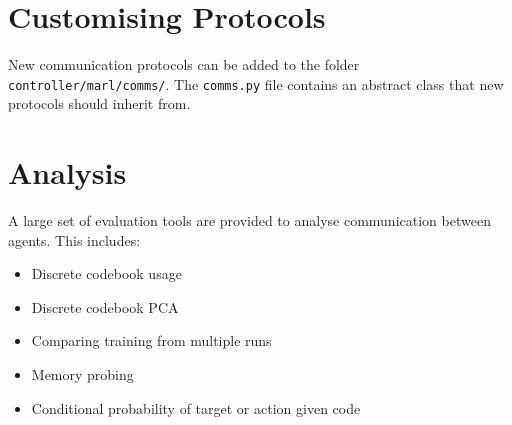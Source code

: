 \section{Customising Protocols}

New communication protocols can be added to the folder \texttt{controller/marl/comms/}. The \texttt{comms.py} file contains an abstract class that new protocols should inherit from.

\section{Analysis}

A large set of evaluation tools are provided to analyse communication between agents. This includes:

\begin{itemize}[noitemsep, topsep=0pt]
    \item Discrete codebook usage
    \item Discrete codebook PCA
    \item Comparing training from multiple runs
    \item Memory probing
    \item Conditional probability of target or action given code
\end{itemize}
